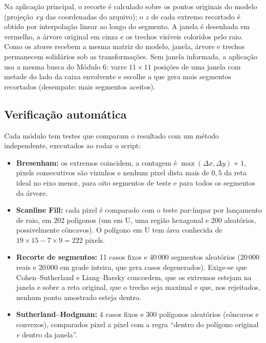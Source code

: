 \documentclass[11pt, a4paper]{article}
\begin{document}
Na aplicação principal, o recorte é calculado sobre os pontos originais do modelo (projeção $xy$ das coordenadas do arquivo); o $z$ de cada extremo recortado é obtido por interpolação linear ao longo do segmento. A janela é desenhada em vermelho, a árvore original em cinza e os trechos visíveis coloridos pelo raio. Como os atores recebem a mesma matriz do modelo, janela, árvore e trechos permanecem solidários sob as transformações. Sem janela informada, a aplicação usa a mesma busca do Módulo 6: varre $11\times11$ posições de uma janela com metade do lado da caixa envolvente e escolhe a que gera mais segmentos recortados (desempate: mais segmentos aceitos).

\subsection{Verificação automática}
Cada módulo tem testes que comparam o resultado com um método independente, executados ao rodar o script:
\begin{itemize}[leftmargin=*]
  \item \textbf{Bresenham:} os extremos coincidem, a contagem é $\max(\Delta x,\Delta y)+1$, pixels consecutivos são vizinhos e nenhum pixel dista mais de $0{,}5$ da reta ideal no eixo menor, para oito segmentos de teste e para todos os segmentos da árvore.
  \item \textbf{Scanline Fill:} cada pixel é comparado com o teste par-ímpar por lançamento de raio, em 202 polígonos (um em U, uma região hexagonal e 200 aleatórios, possivelmente côncavos). O polígono em U tem área conhecida de $19\times15-7\times9=222$ pixels.
  \item \textbf{Recorte de segmentos:} 11 casos fixos e 40\,000 segmentos aleatórios (20\,000 reais e 20\,000 em grade inteira, que gera casos degenerados). Exige-se que Cohen--Sutherland e Liang--Barsky concordem, que os extremos estejam na janela e sobre a reta original, que o trecho seja maximal e que, nos rejeitados, nenhum ponto amostrado esteja dentro.
  \item \textbf{Sutherland--Hodgman:} 4 casos fixos e 300 polígonos aleatórios (côncavos e convexos), comparados pixel a pixel com a regra ``dentro do polígono original \emph{e} dentro da janela''.
\end{itemize}
\end{document}
